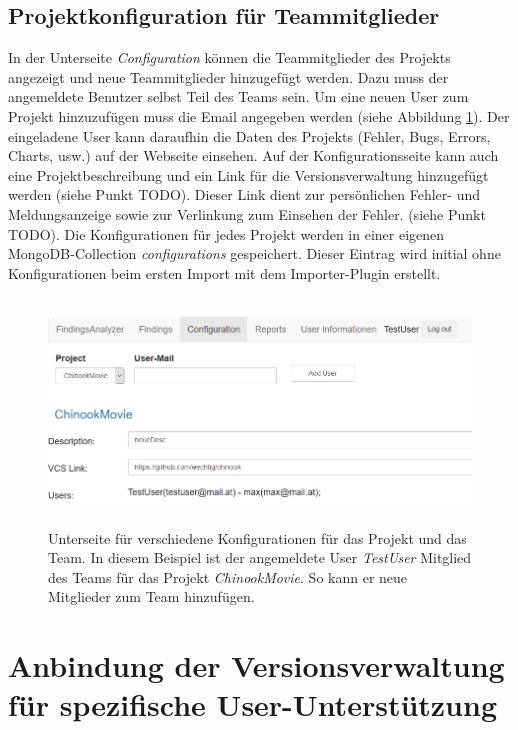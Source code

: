 \subsection{Projektkonfiguration für Teammitglieder}
In der Unterseite \textit{Configuration} können die Teammitglieder des Projekts angezeigt und neue Teammitglieder hinzugefügt werden. Dazu muss der angemeldete Benutzer selbst Teil des Teams sein. Um eine neuen User zum Projekt hinzuzufügen muss die Email angegeben werden (siehe Abbildung \ref{fig:configuration}). Der eingeladene User kann daraufhin die Daten des Projekts (Fehler, Bugs, Errors, Charts, usw.) auf der Webseite einsehen. Auf der Konfigurationsseite kann auch eine Projektbeschreibung und ein Link für die Versionsverwaltung hinzugefügt werden (siehe Punkt TODO). Dieser Link dient zur persönlichen Fehler- und Meldungsanzeige sowie zur Verlinkung zum Einsehen der Fehler. (siehe Punkt TODO). Die Konfigurationen für jedes Projekt werden in einer eigenen MongoDB-Collection \textit{configurations} gespeichert. Dieser Eintrag wird initial ohne Konfigurationen beim ersten Import mit dem Importer-Plugin  erstellt.
\begin{figure}[tp]
  \centering
  \includegraphics[height=6cm]{images/configuration.PNG}
 \caption[Konfiguration für das Projekt und Team]{Unterseite für verschiedene Konfigurationen für das Projekt und das Team. In diesem Beispiel ist der angemeldete User \textit{TestUser} Mitglied des Teams für das Projekt \textit{ChinookMovie}. So kann er neue Mitglieder zum Team hinzufügen.}
  \label{fig:configuration}
\end{figure}
\section{Anbindung der Versionsverwaltung für spezifische User-Unterstützung}
